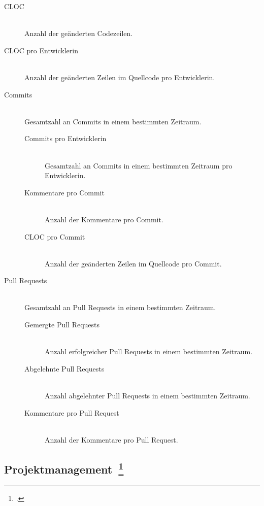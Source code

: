 \begin{description}
  \item[\ac{CLOC}] \hfill \\ Anzahl der geänderten Codezeilen.
  \item[\ac{CLOC} pro Entwicklerin] \hfill \\ Anzahl der geänderten Zeilen im Quellcode pro Entwicklerin.
  \item[Commits] \hfill \\ Gesamtzahl an Commits in einem bestimmten Zeitraum.
  \begin{description}
    \item[Commits pro Entwicklerin] \hfill \\ Gesamtzahl an Commits in einem bestimmten Zeitraum pro Entwicklerin.
    \item[Kommentare pro Commit] \hfill \\ Anzahl der Kommentare pro Commit.
    \item[\ac{CLOC} pro Commit] \hfill \\ Anzahl der geänderten Zeilen im Quellcode pro Commit.
  \end{description}
  \item[Pull Requests] \hfill \\ Gesamtzahl an Pull Requests in einem bestimmten Zeitraum.
  \begin{description}
    \item[Gemergte Pull Requests] \hfill \\ Anzahl erfolgreicher Pull Requests in einem bestimmten Zeitraum.
    \item[Abgelehnte Pull Requests] \hfill \\ Anzahl abgelehnter Pull Requests in einem bestimmten Zeitraum.
    \item[Kommentare pro Pull Request] \hfill \\ Anzahl der Kommentare pro Pull Request.
  \end{description}
\end{description}

\clearpage
\subsection[Projektmanagement]{Projektmanagement~\footcite[vgl.][S.37ff]{davis_agile_2015}}

